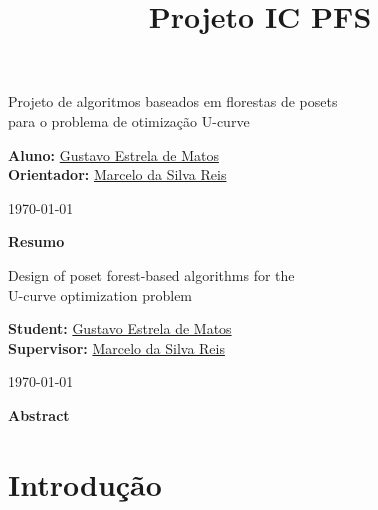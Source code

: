 \documentclass[12pt]{article}
\title{Projeto IC PFS}
\begin{document}
%
\doublespacing

\begin{center}
    {\LARGE Projeto de algoritmos baseados em florestas de posets\\
        \bigskip 
        para o problema de otimização U-curve}

    \bigskip        

    {\large {\bf Aluno:} \href{mailto:gustavo.estrela.matos@usp.br}
        {Gustavo Estrela de Matos}\\ 
    {\bf Orientador:} \href{mailto:marcelo.reis@butantan.gov.br}
        {Marcelo da Silva Reis}\\

    \bigskip

    \today\\
    }

    \bigskip
    \bigskip

    {\bf Resumo}    
\end{center}

\newpage

\begin{center}
    {\LARGE Design of poset forest-based algorithms for the\\
        \bigskip 
        U-curve optimization problem}

    \bigskip        

    {\large {\bf Student:} \href{mailto:gustavo.estrela.matos@usp.br}
        {Gustavo Estrela de Matos}\\ 
    {\bf Supervisor:} \href{mailto:marcelo.reis@butantan.gov.br}
        {Marcelo da Silva Reis}\\

    \bigskip

    \today\\
    }

    \bigskip
    \bigskip

    {\bf Abstract}    
\end{center}
    
\newpage
\tableofcontents
\newpage

\section{Introdução}

% 
\end{document}
